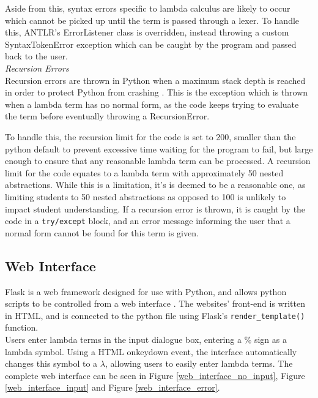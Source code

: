 \documentclass[a4paper,11pt]{report}
\begin{document}
Aside from this, syntax errors specific to lambda calculus are likely to occur which cannot be picked up until the term is passed through a lexer. To handle this, ANTLR's ErrorListener class is overridden, instead throwing a custom SyntaxTokenError exception which can be caught by the program and passed back to the user.\\

\textit{Recursion Errors}\\
Recursion errors are thrown in Python when a maximum stack depth is reached in order to protect Python from crashing \cite{PythonStack2019}. This is the exception which is thrown when a lambda term has no normal form, as the code keeps trying to evaluate the term before eventually throwing a RecursionError.

To handle this, the recursion limit for the code is set to 200, smaller than the python default to prevent excessive time waiting for the program to fail, but large enough to ensure that any reasonable lambda term can be processed. A recursion limit for the code equates to a lambda term with approximately 50 nested abstractions. While this is a limitation, it's is deemed to be a reasonable one, as limiting students to 50 nested abstractions as opposed to 100 is unlikely to impact student understanding. If a recursion error is thrown, it is caught by the code in a \texttt{try/except} block, and an error message informing the user that a normal form cannot be found for this term is given.

\subsection{Web Interface}

Flask is a web framework designed for use with Python, and allows python scripts to be controlled from a web interface \cite{FullStack2019}. The websites' front-end is written in HTML, and is connected to the python file using Flask's \texttt{render_template()} function.\\

Users enter lambda terms in the input dialogue box, entering a \% sign as a lambda symbol. Using a HTML onkeydown event, the interface automatically changes this symbol to a $\lambda$, allowing users to easily enter lambda terms. The complete web interface can be seen in Figure \ref{web_interface_no_input}, Figure \ref{web_interface_input} and Figure \ref{web_interface_error}.\\
\end{document}
